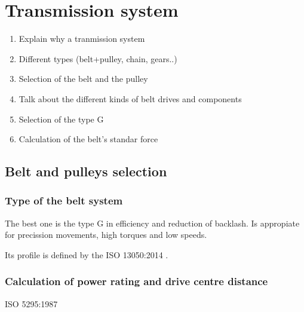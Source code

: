 \section{Transmission system} %
\label{sec:transmission_system}
\begin{enumerate}
	\item Explain why a tranmission system
	\item Different types (belt+pulley, chain, gears..)
	\item Selection of the belt and the pulley
		\item Talk about the different kinds of belt drives and components
		\item Selection of the type G
		\item Calculation of the belt's standar force
\end{enumerate}

	\subsection{Belt and pulleys selection} %
	\label{sub:belt_and_pulleys_selection}
	
	\subsubsection{Type of the belt system}	 %
	\label{ssub:type_of_the_belt_system}
	

	The best one is the type G in efficiency and reduction of backlash.
	Is appropiate for precission movements, high torques and low speeds.

	Its profile is defined by the ISO 13050:2014 \cite{ISO13050}.


	\subsubsection{Calculation of power rating and drive centre distance} %
	\label{ssub:calculation_of_power_rating_and_drive_centre_distance}
	ISO 5295:1987 \cite{ISO5295}
	

